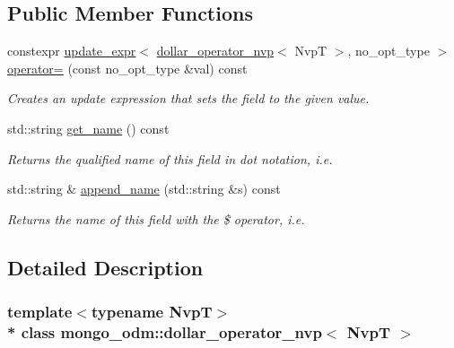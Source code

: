 \subsection*{Public Member Functions}
\begin{DoxyCompactItemize}
\item 
constexpr \hyperlink{classmongo__odm_1_1update__expr}{update\+\_\+expr}$<$ \hyperlink{classmongo__odm_1_1dollar__operator__nvp}{dollar\+\_\+operator\+\_\+nvp}$<$ NvpT $>$, no\+\_\+opt\+\_\+type $>$ \hyperlink{classmongo__odm_1_1dollar__operator__nvp_a09553e7ffa1350ae96b53b0050c83d45}{operator=} (const no\+\_\+opt\+\_\+type \&val) const \hypertarget{classmongo__odm_1_1dollar__operator__nvp_a09553e7ffa1350ae96b53b0050c83d45}{}\label{classmongo__odm_1_1dollar__operator__nvp_a09553e7ffa1350ae96b53b0050c83d45}

\begin{DoxyCompactList}\small\item\em Creates an update expression that sets the field to the given value. \end{DoxyCompactList}\item 
std\+::string \hyperlink{classmongo__odm_1_1dollar__operator__nvp_a4ccad25d5b45c435cf3600826eed9315}{get\+\_\+name} () const 
\begin{DoxyCompactList}\small\item\em Returns the qualified name of this field in dot notation, i.\+e. \end{DoxyCompactList}\item 
std\+::string \& \hyperlink{classmongo__odm_1_1dollar__operator__nvp_af61ffed690dde76d535d3bda787711ad}{append\+\_\+name} (std\+::string \&s) const 
\begin{DoxyCompactList}\small\item\em Returns the name of this field with the \$ operator, i.\+e. \end{DoxyCompactList}\end{DoxyCompactItemize}


\subsection{Detailed Description}
\subsubsection*{template$<$typename NvpT$>$\\*
class mongo\+\_\+odm\+::dollar\+\_\+operator\+\_\+nvp$<$ Nvp\+T $>$}

